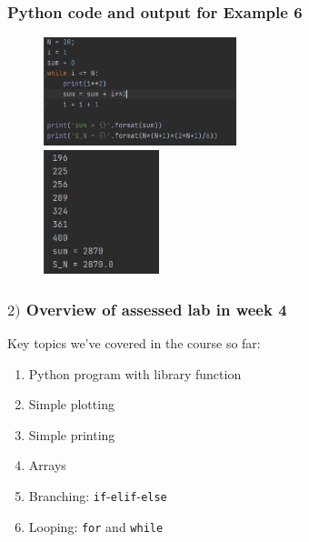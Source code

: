 \documentclass[english,14pt]{beamer}
\begin{document}

\begin{frame}[fragile]

\frametitle{Python code and output for Example 6}

\begin{figure}[ht]
	\centering
	\includegraphics[width=0.5\textwidth]{figures/Week3ThuEx6a}\\
	\vspace*{2mm}
	\includegraphics[width=0.3\textwidth]{figures/Week3ThuEx6b}
\end{figure}

\end{frame}


\begin{frame}[fragile]

\frametitle{$2)$ Overview of assessed lab in week 4}

Key topics we've covered in the course so far:

\vspace*{5mm}

\begin{enumerate}
	\item Python program with library function
	\item Simple plotting
	\item Simple printing
	\item Arrays
	\item Branching: \texttt{if}-\texttt{elif}-\texttt{else}
	\item Looping: \texttt{for} and \texttt{while}
\end{enumerate}

\end{frame}
\end{document}
